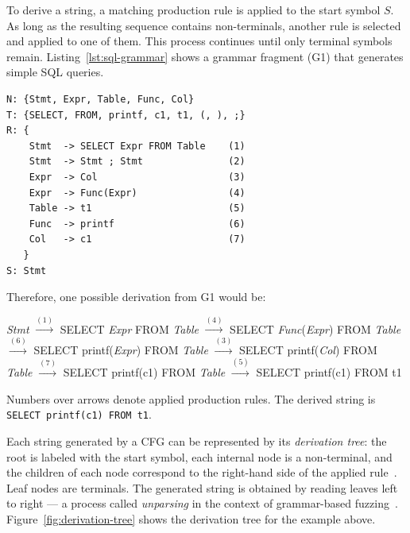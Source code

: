 To derive a string, a matching production rule is applied to the start symbol $S$. As long as the resulting sequence contains non-terminals, another rule is selected and applied to one of them. This process continues until only terminal symbols remain. Listing~\ref{lst:sql-grammar} shows a grammar fragment (G1) that generates simple SQL queries.

\begin{lstlisting}[caption={Grammar G1 for simple SQL queries.}, label={lst:sql-grammar}, basicstyle=\ttfamily\small, numbers=none, frame=single, xleftmargin=1cm, xrightmargin=1cm]
N: {Stmt, Expr, Table, Func, Col}
T: {SELECT, FROM, printf, c1, t1, (, ), ;}
R: {
    Stmt  -> SELECT Expr FROM Table    (1)
    Stmt  -> Stmt ; Stmt               (2)
    Expr  -> Col                       (3)
    Expr  -> Func(Expr)                (4)
    Table -> t1                        (5)
    Func  -> printf                    (6)
    Col   -> c1                        (7)
   }
S: Stmt
\end{lstlisting}

Therefore, one possible derivation from G1 would be:

\begin{center}
\textit{Stmt} $\xrightarrow{(1)}$ SELECT \textit{Expr} FROM \textit{Table} $\xrightarrow{(4)}$ SELECT \textit{Func}(\textit{Expr}) FROM \textit{Table} $\xrightarrow{(6)}$ SELECT printf(\textit{Expr}) FROM \textit{Table} $\xrightarrow{(3)}$ SELECT printf(\textit{Col}) FROM \textit{Table} $\xrightarrow{(7)}$ SELECT printf(c1) FROM \textit{Table} $\xrightarrow{(5)}$ SELECT printf(c1) FROM t1
\end{center}

\noindent Numbers over arrows denote applied production rules. The derived string is \texttt{SELECT printf(c1) FROM t1}.

Each string generated by a CFG can be represented by its \textit{derivation tree}: the root is labeled with the start symbol, each internal node is a non-terminal, and the children of each node correspond to the right-hand side of the applied rule~\citep{hopcroft}. Leaf nodes are terminals. The generated string is obtained by reading leaves left to right --- a process called \textit{unparsing} in the context of grammar-based fuzzing~\citep{nautilus}. Figure~\ref{fig:derivation-tree} shows the derivation tree for the example above.

